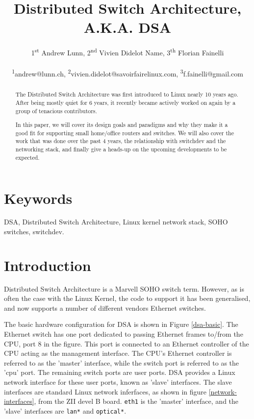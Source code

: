 \documentclass[letterpaper]{article}
\title{Distributed Switch Architecture,\\ A.K.A. DSA}
\author{1\textsuperscript{st} Andrew Lunn, 2\textsuperscript{nd} Vivien Didelot Name,  3\textsuperscript{th} Florian Fainelli\\
  \\
  \textsuperscript{1}andrew@lunn.ch,
  \textsuperscript{2}vivien.didelot@savoirfairelinux.com,
  \textsuperscript{3}f.fainelli@gmail.com\\
}
\begin{document}
\maketitle
\begin{abstract}

  The Distributed Switch Architecture was first introduced to Linux
  nearly 10 years ago. After being mostly quiet for 6 years, it
  recently became actively worked on again by a group of tenacious
  contributors.

  In this paper, we will cover its design goals and paradigms and why
  they make it a good fit for supporting small home/office routers and
  switches. We will also cover the work that was done over the past 4
  years, the relationship with switchdev and the networking stack, and
  finally give a heads-up on the upcoming developments to be expected.
\end{abstract}

\section{Keywords}

DSA, Distributed Switch Architecture, Linux kernel network stack, SOHO
switches, switchdev.

\section{Introduction}

Distributed Switch Architecture is a Marvell SOHO switch
term. However, as is often the case with the Linux Kernel, the code to
support it has been generalised, and now supports a number of
different vendors Ethernet switches.

The basic hardware configuration for DSA is shown in Figure
\ref{dsa-basic}. The Ethernet switch has one port dedicated to passing
Ethernet frames to/from the CPU, port 8 in the figure. This port is
connected to an Ethernet controller of the CPU acting as the
management interface. The CPU's Ethernet controller is referred to as
the 'master' interface, while the switch port is referred to as the
'cpu' port. The remaining switch ports are user ports. DSA provides a
Linux network interface for these user ports, known as 'slave'
interfaces. The slave interfaces are standard Linux network
inferfaces, as shown in figure \ref{network-interfaces}, from the ZII
devel B board.  \verb|eth1| is the 'master' interface, and the 'slave'
interfaces are \verb|lan*| and \verb|optical*|.
\end{document}
